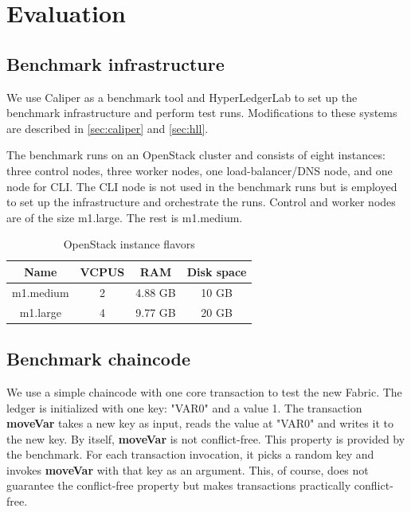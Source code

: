 \chapter{Evaluation}
\label{chapter:evaluation}

\section{Benchmark infrastructure}\label{sec:infra}

We use Caliper as a benchmark tool and HyperLedgerLab to set up the benchmark infrastructure and perform test runs. Modifications to these systems are described in \ref{sec:caliper} and \ref{sec:hll}.

The benchmark runs on an OpenStack cluster and consists of eight instances: three control nodes, three worker nodes, one load-balancer/DNS node, and one node for CLI. The CLI node is not used in the benchmark runs but is employed to set up the infrastructure and orchestrate the runs. Control and worker nodes are of the size m1.large. The rest is m1.medium.

\begin{table}[h!]
\begin{center}
\begin{tabular}{ |c|c|c|c| }
  \hline
  Name & VCPUS & RAM & Disk space \\
  \hline
  \hline
  m1.medium & 2 & 4.88 GB & 10 GB \\
  \hline
  m1.large  & 4 & 9.77 GB & 20 GB \\
  \hline
\end{tabular}
\end{center}
\caption{OpenStack instance flavors}
\label{table:flavors}
\end{table}

\newpage

\section{Benchmark chaincode}\label{sec:benchcode}

We use a simple chaincode with one core transaction to test the new Fabric. The ledger is initialized with one key: "VAR0" and a value 1. The transaction \textbf{moveVar} takes a new key as input, reads the value at "VAR0" and writes it to the new key. By itself,  \textbf{moveVar} is not conflict-free. This property is provided by the benchmark. For each transaction invocation, it picks a random key and invokes \textbf{moveVar} with that key as an argument. This, of course, does not guarantee the conflict-free property but makes transactions practically conflict-free.

